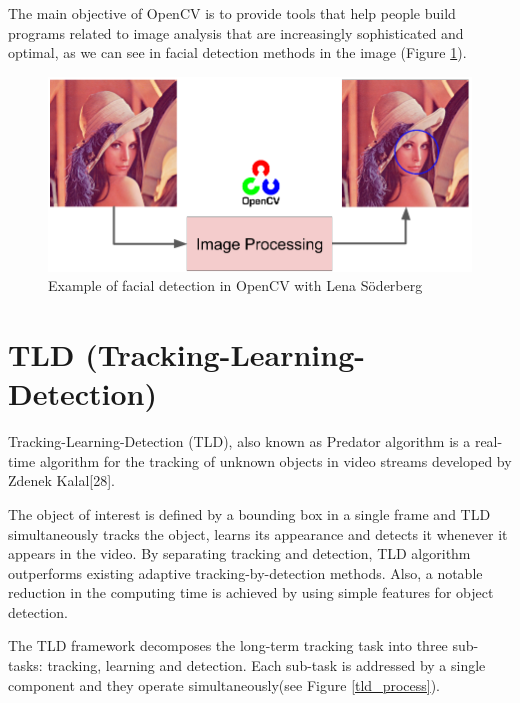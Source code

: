 The main objective of OpenCV is to provide tools that help people build programs related to image analysis that are increasingly sophisticated and optimal, as we can see in facial detection methods in the image (Figure \ref{image_processing}).

\begin{figure}[h!]
\centering
\includegraphics[scale=0.7]{figures/image_processing.png}
\caption{Example of facial detection in OpenCV with Lena Söderberg}
\label{image_processing}
\end{figure}



\section{TLD (Tracking-Learning-Detection)}

Tracking-Learning-Detection (TLD), also known as Predator algorithm is a real-time algorithm for the tracking of unknown objects in video streams developed by Zdenek Kalal[28].

The object of interest is defined by a bounding box in a single frame and TLD simultaneously tracks the object, learns its appearance and detects it whenever it appears in the video.
By separating tracking and detection, TLD algorithm outperforms existing adaptive tracking-by-detection methods. Also, a notable reduction in the computing time is achieved by using simple features for object detection.

The TLD framework decomposes the long-term tracking task into three sub-tasks: tracking, learning and detection. Each sub-task is addressed by a single component and they operate simultaneously(see Figure \ref{tld_process}).

